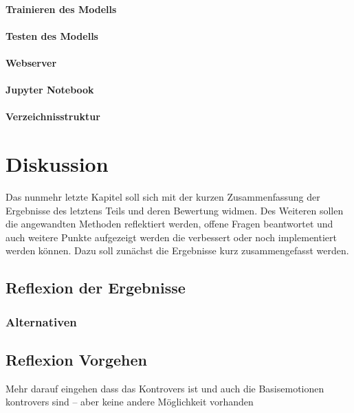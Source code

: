 \documentclass[12pt, a4paper]{scrbook}
\begin{document}
\subsubsection{Trainieren des Modells}

\subsubsection{Testen des Modells}

\subsubsection{Webserver}

\subsubsection{Jupyter Notebook}

\subsubsection{Verzeichnisstruktur}

\let\cleardoublepage\relax
\chapter{Diskussion}
Das nunmehr letzte Kapitel soll sich mit der kurzen Zusammenfassung der Ergebnisse des letztens Teils und deren Bewertung widmen. 
Des Weiteren sollen die angewandten Methoden reflektiert werden,
offene Fragen beantwortet und auch weitere Punkte aufgezeigt werden die verbessert oder noch implementiert werden können. Dazu soll zunächst die Ergebnisse kurz zusammengefasst werden.

\section{Reflexion der Ergebnisse}

\subsection{Alternativen}

\section{Reflexion Vorgehen}
Mehr darauf eingehen dass das Kontrovers ist und auch die Basisemotionen kontrovers sind --  aber keine andere Möglichkeit vorhanden 
\end{document}
